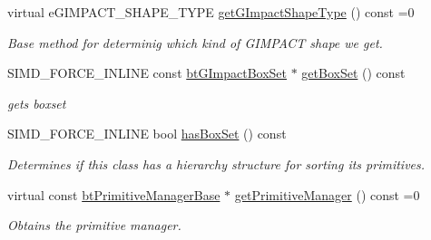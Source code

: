 \begin{DoxyCompactItemize}
\item 
virtual e\+G\+I\+M\+P\+A\+C\+T\+\_\+\+S\+H\+A\+P\+E\+\_\+\+T\+Y\+PE \hyperlink{classbtGImpactShapeInterface_a25cacbe448997e3f8ec99cb2d4952859}{get\+G\+Impact\+Shape\+Type} () const =0
\begin{DoxyCompactList}\small\item\em Base method for determinig which kind of G\+I\+M\+P\+A\+CT shape we get. \end{DoxyCompactList}\item 
\mbox{\label{classbtGImpactShapeInterface_a31751779f73b98bca7ea116cb3b07e13}} 
S\+I\+M\+D\+\_\+\+F\+O\+R\+C\+E\+\_\+\+I\+N\+L\+I\+NE const \hyperlink{classbtGImpactQuantizedBvh}{bt\+G\+Impact\+Box\+Set} $\ast$ \hyperlink{classbtGImpactShapeInterface_a31751779f73b98bca7ea116cb3b07e13}{get\+Box\+Set} () const
\begin{DoxyCompactList}\small\item\em gets boxset \end{DoxyCompactList}\item 
\mbox{\label{classbtGImpactShapeInterface_af8cc682e76969583dc5636079081e63c}} 
S\+I\+M\+D\+\_\+\+F\+O\+R\+C\+E\+\_\+\+I\+N\+L\+I\+NE bool \hyperlink{classbtGImpactShapeInterface_af8cc682e76969583dc5636079081e63c}{has\+Box\+Set} () const
\begin{DoxyCompactList}\small\item\em Determines if this class has a hierarchy structure for sorting its primitives. \end{DoxyCompactList}\item 
\mbox{\label{classbtGImpactShapeInterface_a291328e80a5f22cffc50924ebb90040a}} 
virtual const \hyperlink{classbtPrimitiveManagerBase}{bt\+Primitive\+Manager\+Base} $\ast$ \hyperlink{classbtGImpactShapeInterface_a291328e80a5f22cffc50924ebb90040a}{get\+Primitive\+Manager} () const =0
\begin{DoxyCompactList}\small\item\em Obtains the primitive manager. \end{DoxyCompactList}\item 
\mbox{\label{classbtGImpactShapeInterface_aa145ed4669ce202e97d1a9e1081b3560}} 

\end{DoxyCompactItemize}

